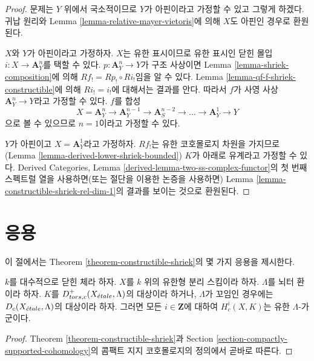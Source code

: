 \begin{proof}
문제는 $Y$ 위에서 국소적이므로 $Y$가 아핀이라고 가정할 수 있고
그렇게 하겠다. 귀납 원리와 Lemma
\ref{lemma-relative-mayer-vietoris}에 의해 $X$도 아핀인 경우로
환원된다.

\medskip\noindent
$X$와 $Y$가 아핀이라고 가정하자. $X$는 유한 표시이므로 유한 표시인
닫힌 몰입 $i : X \to \mathbf{A}^n_Y$를 택할 수 있다.
$p : \mathbf{A}^n_Y \to Y$가 구조 사상이면 Lemma
\ref{lemma-shriek-composition}에 의해
$Rf_! = Rp_! \circ Ri_!$임을 알 수 있다. Lemma
\ref{lemma-qf-f-shriek-constructible}에 의해 $Ri_! = i_!$에 대해서는
결과를 안다. 따라서 $f$가 사영 사상
$\mathbf{A}^n_Y \to Y$라고 가정할 수 있다.
$f$를 합성
$$
X = \mathbf{A}^n_Y \to \mathbf{A}^{n - 1}_Y \to
\mathbf{A}^{n - 2}_S \to \ldots \to
\mathbf{A}^1_Y \to Y
$$
으로 볼 수 있으므로 $n = 1$이라고 가정할 수 있다.

\medskip\noindent
$Y$가 아핀이고 $X = \mathbf{A}^1_Y$라고 가정하자.
$Rf_!$는 유한 코호몰로지 차원을 가지므로(Lemma
\ref{lemma-derived-lower-shriek-bounded}) $K$가 아래로 유계라고
가정할 수 있다. Derived Categories, Lemma
\ref{derived-lemma-two-ss-complex-functor}의 첫 번째 스펙트럴 열을
사용하면(또는 절단을 이용한 논증을 사용하면) Lemma
\ref{lemma-constructible-shriek-rel-dim-1}의 결과를 보이는 것으로
환원된다.
\end{proof}


\section{응용}
\label{section-applications}

\noindent
이 절에서는 Theorem \ref{theorem-constructible-shriek}의 몇 가지
응용을 제시한다.

\begin{lemma}
\label{lemma-finiteness-compactly-supported}
$k$를 대수적으로 닫힌 체라 하자.
$X$를 $k$ 위의 유한형 분리 스킴이라 하자.
$\Lambda$를 뇌터 환이라 하자. $K$를
$D^+_{tors, c}(X_{\acute{e}tale}, \Lambda)$의 대상이라 하거나,
$\Lambda$가 꼬임인 경우에는 $D_c(X_{\acute{e}tale}, \Lambda)$의 대상이라 하자.
그러면 모든 $i \in \mathbf{Z}$에 대하여 $H^i_c(X, K)$는 유한
$\Lambda$-가군이다.
\end{lemma}

\begin{proof}
Theorem \ref{theorem-constructible-shriek}과 Section
\ref{section-compactly-supported-cohomology}의 콤팩트 지지
코호몰로지의 정의에서 곧바로 따른다.
\end{proof}

